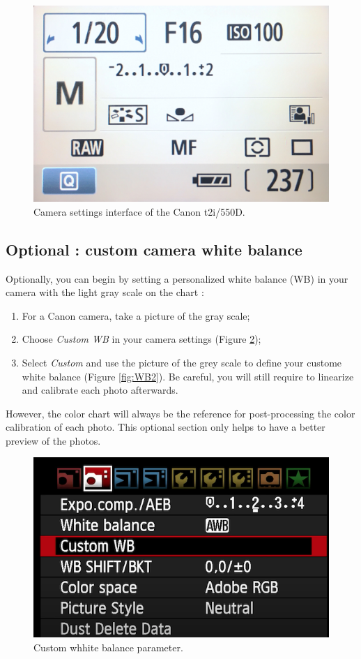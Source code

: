 \documentclass[
]{book}
\begin{document}
\begin{figure}

{\centering \includegraphics[width=0.5\linewidth]{Figures/camera_settings} 

}

\caption{Camera settings interface of the Canon t2i/550D.}\label{fig:camera-settings}
\end{figure}

\hypertarget{optional-custom-camera-white-balance}{%
\subsection{Optional : custom camera white balance}\label{optional-custom-camera-white-balance}}

Optionally, you can begin by setting a personalized white balance (WB) in
your camera with the light gray scale on the chart :

\begin{enumerate}
\def\labelenumi{\arabic{enumi}.}
\item
  For a Canon camera, take a picture of the gray scale;
\item
  Choose \emph{Custom WB} in your camera settings (Figure \ref{fig:WB});
\item
  Select \emph{Custom} and use the picture of the grey scale to define your custome white balance (Figure \ref{fig:WB2}). Be careful, you will still require to linearize and calibrate each photo afterwards.
\end{enumerate}

However, the color chart will always be the reference for
post-processing the color calibration of each photo. This optional
section only helps to have a better preview of the photos.

\begin{figure}

{\centering \includegraphics[width=0.5\linewidth]{Figures/Custom WB setting} 

}

\caption{Custom whhite balance parameter.}\label{fig:WB}
\end{figure}
\end{document}
